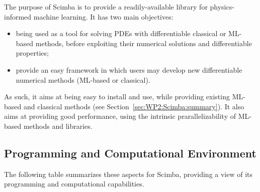 The purpose of Scimba is to provide a readily-available
library for physics-informed machine learning.
It has two main objectives:
\begin{itemize}
    \item being used as a tool for solving PDEs
          with differentiable classical or ML-based methods,
          before exploiting their numerical solutions
          and differentiable properties;
    \item provide an easy framework in which users
          may develop new differentiable numerical methods
          (ML-based or classical).
\end{itemize}
As such, it aims at being easy to install and use,
while providing existing ML-based and classical methods
(see Section~\ref{sec:WP2:Scimba:summary}).
It also aims at providing good performance,
using the intrinsic prarallelizability of
ML-based methods and libraries.

\subsection{Programming and Computational Environment}
\label{sec::Scimba:environment_capabilities}

The following table summarizes these aspects for Scimba, providing a  view of its programming and computational capabilities.

